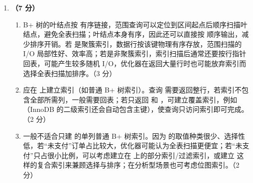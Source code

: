 \documentclass[a4paper,11pt]{article}
\begin{document}
\begin{enumerate}[start=21, label=\textbf{\arabic*.}, leftmargin=2.4em, itemsep=0.45em]
\item \textbf{（7 分）}
\begin{enumerate}[label=（\arabic*）, leftmargin=2.2em, itemsep=2pt]
  \item B+ 树的叶结点按  有序链接，范围查询可以定位到区间起点后顺序扫描叶结点，避免全表扫描；叶结点本身有序，因此还可以直接按  顺序输出，减少排序开销。若  是聚簇索引，数据行按该键物理有序存放，范围扫描的 I/O 局部性好、效率高；若是非聚簇索引，索引扫描后通常还要按行指针回表，可能产生较多随机 I/O，优化器在返回大量行时也可能放弃索引而选择全表扫描加排序。\hfill（3 分）
  \item 应在  上建立索引（如普通 B+ 树索引）。查询  需要返回整行，若索引不包含全部所需列，一般需要回表；若只返回  和 ，可建立覆盖索引，例如 （InnoDB 的二级索引还会自动包含主键），使查询只访问索引即可完成。\hfill（2 分）
  \item 一般不适合只建  的单列普通 B+ 树索引。因为  的取值种类很少、选择性低，若“未支付”订单占比较大，优化器可能认为全表扫描更便宜；若“未支付”只占很小比例，可以考虑建立在  上的部分索引/过滤索引，或建立  这样的复合索引来兼顾选择与排序；在分析型场景也可考虑位图索引。\hfill（2 分）
\end{enumerate}

\end{enumerate}

\end{document}
